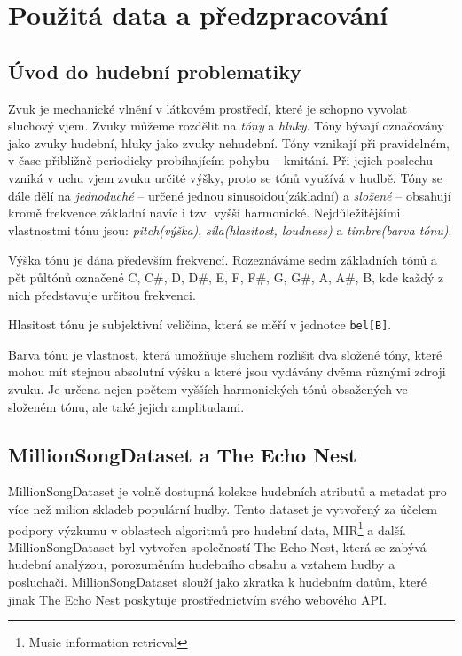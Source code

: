 \documentclass[thesis=M,czech]{FITthesis}[2012/06/26]
\begin{document}
\chapter{Použitá data a předzpracování}\label{ch:empl_prepro}
\section{Úvod do hudební problematiky}
Zvuk je mechanické vlnění v látkovém prostředí, které je schopno vyvolat sluchový vjem. Zvuky můžeme rozdělit na \textit{tóny} a \textit{hluky}. Tóny bývají označovány jako zvuky hudební, hluky jako zvuky nehudební. Tóny vznikají při pravidelném, v čase přibližně periodicky probíhajícím pohybu -- kmitání. Při jejich poslechu vzniká v uchu vjem zvuku určité výšky, proto se tónů využívá v hudbě. Tóny se dále dělí na \textit{jednoduché} -- určené jednou sinusoidou(základní) a \textit{složené} -- obsahují kromě frekvence základní navíc i tzv. vyšší harmonické. Nejdůležitějšími vlastnostmi tónu jsou: \textit{pitch(výška)}, \textit{síla(hlasitost, loudness)} a \textit{timbre(barva tónu)}.

Výška tónu je dána především frekvencí. Rozeznáváme sedm základních tónů a pět půltónů označené C, C\#, D, D\#, E, F, F\#, G, G\#, A, A\#, B, kde každý z nich představuje určitou frekvenci.

Hlasitost tónu je subjektivní veličina, která se měří v jednotce \texttt{bel[B]}.

Barva tónu je vlastnost, která umožňuje sluchem rozlišit dva složené tóny, které mohou mít stejnou absolutní výšku a které jsou vydávány dvěma různými zdroji zvuku. Je určena nejen počtem vyšších harmonických tónů obsažených ve složeném tónu, ale také jejich amplitudami. \cite{zvuk-ency}
 



\section{MillionSongDataset a The Echo Nest}
MillionSongDataset je volně dostupná kolekce hudebních atributů a metadat pro více než milion skladeb populární hudby. Tento dataset je vytvořený za účelem podpory výzkumu v oblastech algoritmů pro hudební data, MIR\footnote{Music information retrieval} a další. MillionSongDataset byl vytvořen společností The Echo Nest, která se zabývá hudební analýzou, porozuměním hudebního obsahu a vztahem hudby a posluchači. MillionSongDataset slouží jako zkratka k hudebním datům, které jinak The Echo Nest poskytuje prostřednictvím svého webového API.
\end{document}
